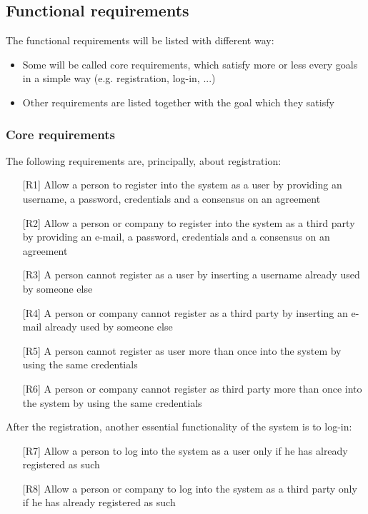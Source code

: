 \subsection{Functional requirements}
\par
The functional requirements will be listed with different way:
\begin{itemize}
\item Some will be called core requirements, which satisfy more or less every goals in a simple way (e.g. registration, log-in, ...)
\item Other requirements are listed together with the goal which they satisfy
\end{itemize}

\subsubsection{Core requirements}
\par
The following requirements are, principally, about registration:
\begin{itemize}
\item[{[R1]}] Allow a person to register into the system as a user by providing an username, a password, credentials and a consensus on an agreement
\item[{[R2]}] Allow a person or company to register into the system as a third party by providing an e-mail, a password, credentials and a consensus on an agreement
\item[{[R3]}] A person cannot register as a user by inserting a username already used by someone else
\item[{[R4]}] A person or company cannot register as a third party by inserting an e-mail already used by someone else
\item[{[R5]}] A person cannot register as user more than once into the system by using the same credentials
\item[{[R6]}] A person or company cannot register as third party more than once into the system by using the same credentials
\end{itemize}
\par
After the registration, another essential functionality of the system is to log-in:
\begin{itemize}
\item[{[R7]}] Allow a person to log into the system as a user only if he has already registered as such
\item[{[R8]}] Allow a person or company to log into the system as a third party only if he has already registered as such
\end{itemize}

